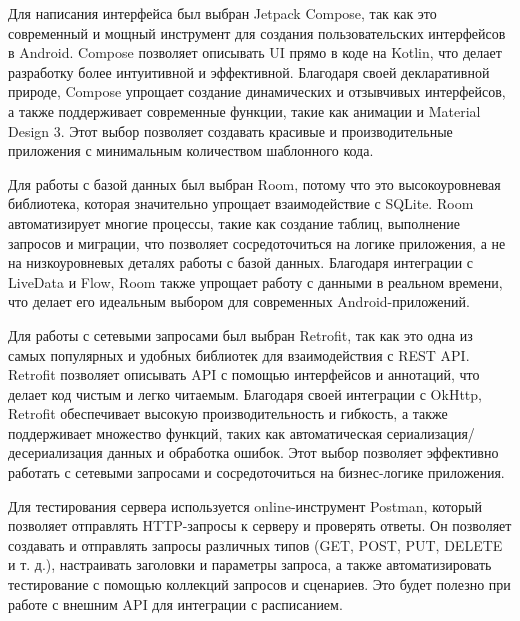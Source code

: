 Для написания интерфейса был выбран Jetpack Compose, так как это современный и мощный инструмент для создания пользовательских интерфейсов в Android. Compose позволяет описывать UI прямо в коде на Kotlin, что делает разработку более интуитивной и эффективной. Благодаря своей декларативной природе, Compose упрощает создание динамических и отзывчивых интерфейсов, а также поддерживает современные функции, такие как анимации и Material Design 3. Этот выбор позволяет создавать красивые и производительные приложения с минимальным количеством шаблонного кода. \cite{refh}

Для работы с базой данных был выбран Room, потому что это высокоуровневая библиотека, которая значительно упрощает взаимодействие с SQLite. \cite{reff} Room автоматизирует многие процессы, такие как создание таблиц, выполнение запросов и миграции, что позволяет сосредоточиться на логике приложения, а не на низкоуровневых деталях работы с базой данных. Благодаря интеграции с LiveData и Flow, Room также упрощает работу с данными в реальном времени, что делает его идеальным выбором для современных Android-приложений.

Для работы с сетевыми запросами был выбран Retrofit, так как это одна из самых популярных и удобных библиотек для взаимодействия с REST API. \cite{refg} Retrofit позволяет описывать API с помощью интерфейсов и аннотаций, что делает код чистым и легко читаемым. Благодаря своей интеграции с OkHttp, Retrofit обеспечивает высокую производительность и гибкость, а также поддерживает множество функций, таких как автоматическая сериализация/десериализация данных и обработка ошибок. Этот выбор позволяет эффективно работать с сетевыми запросами и сосредоточиться на бизнес-логике приложения.

Для тестирования сервера используется online-инструмент Postman, который позволяет отправлять HTTP-запросы к серверу и проверять ответы. \cite{refh} Он позволяет создавать и отправлять запросы различных типов (GET, POST, PUT, DELETE и т. д.), настраивать заголовки и параметры запроса, а также автоматизировать тестирование с помощью коллекций запросов и сценариев. Это будет полезно при работе с внешним API для интеграции с расписанием.
